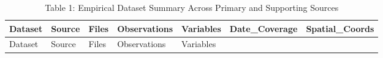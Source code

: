 \documentclass[
]{article}
\begin{document}
\begin{longtable}[]{@{}
  >{\raggedright\arraybackslash}p{}
  >{\raggedright\arraybackslash}p{}
  >{\raggedleft\arraybackslash}p{}
  >{\raggedleft\arraybackslash}p{}
  >{\raggedleft\arraybackslash}p{}
  >{\raggedright\arraybackslash}p{}
  >{\raggedright\arraybackslash}p{}@{}}
\caption{Table 1: Empirical Dataset Summary Across Primary and
Supporting Sources}\tabularnewline
\toprule\noalign{}
\begin{minipage}[b]{\linewidth}\raggedright
Dataset
\end{minipage} & \begin{minipage}[b]{\linewidth}\raggedright
Source
\end{minipage} & \begin{minipage}[b]{\linewidth}\raggedleft
Files
\end{minipage} & \begin{minipage}[b]{\linewidth}\raggedleft
Observations
\end{minipage} & \begin{minipage}[b]{\linewidth}\raggedleft
Variables
\end{minipage} & \begin{minipage}[b]{\linewidth}\raggedright
Date\_Coverage
\end{minipage} & \begin{minipage}[b]{\linewidth}\raggedright
Spatial\_Coords
\end{minipage} \\
\midrule\noalign{}
\endfirsthead
\toprule\noalign{}
\begin{minipage}[b]{\linewidth}\raggedright
Dataset
\end{minipage} & \begin{minipage}[b]{\linewidth}\raggedright
Source
\end{minipage} & \begin{minipage}[b]{\linewidth}\raggedleft
Files
\end{minipage} & \begin{minipage}[b]{\linewidth}\raggedleft
Observations
\end{minipage} & \begin{minipage}[b]{\linewidth}\raggedleft
Variables
\end{minipage} & \begin{minipage}[b]{\linewidth}\raggedright

\end{minipage}
\end{longtable}
\end{document}
